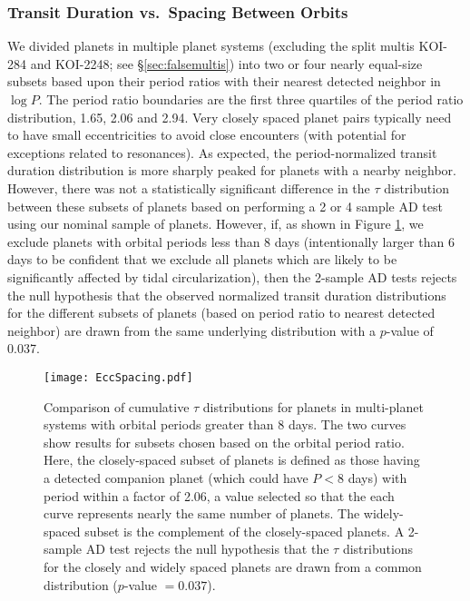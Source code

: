 \documentclass{aastex62}
\begin{document}
\subsubsection{Transit Duration vs.~Spacing Between Orbits}\label{sec:eccspacing}

We divided planets in multiple planet systems (excluding the split multis KOI-284 and KOI-2248; see \S\ref{sec:falsemultis}) into two or four nearly equal-size subsets based upon their period ratios with their nearest detected neighbor in $\log P$.  
The period ratio boundaries are the first three quartiles of the period ratio distribution, 1.65, 2.06 and 2.94. %
Very closely spaced planet pairs typically need to have small eccentricities to avoid close encounters (with potential for exceptions related to resonances).  
As expected, the period-normalized transit duration distribution is more sharply peaked for planets with a nearby neighbor.  However, there was not a statistically significant difference in the $\tau$ distribution between these subsets of planets based on performing a 2 or 4 sample AD test using our nominal sample of planets.  
However, if, as shown in Figure \ref{fig:EccSpacing}, we exclude planets with orbital periods less than 8 days (intentionally larger than 6 days to be confident that we exclude all planets which are likely to be significantly affected by tidal circularization), then {the 2-sample} AD tests rejects the null hypothesis that the observed normalized transit duration distributions for the different subsets of planets (based on period ratio to nearest detected neighbor) are drawn from the same underlying distribution with a $p$-value of 0.037.  

\begin{figure}
    \centering
    \texttt{[image: EccSpacing.pdf]}
    \caption{Comparison of cumulative $\tau$ distributions for planets in multi-planet systems with orbital periods greater than 8 days.  The two curves show results for subsets chosen based on the orbital period ratio.  Here, the closely-spaced subset of planets is defined as those having a detected companion planet (which could have $P<8$ days) with period within a factor of 2.06, a value selected so that the each curve represents nearly the same number of planets.   The widely-spaced subset is the complement of the closely-spaced planets.  A 2-sample AD test rejects the null hypothesis that the $\tau$ distributions for the closely and widely spaced planets are drawn from a common distribution ($p$-value $=0.037$).    }
    \label{fig:EccSpacing}
\end{figure}
\end{document}
